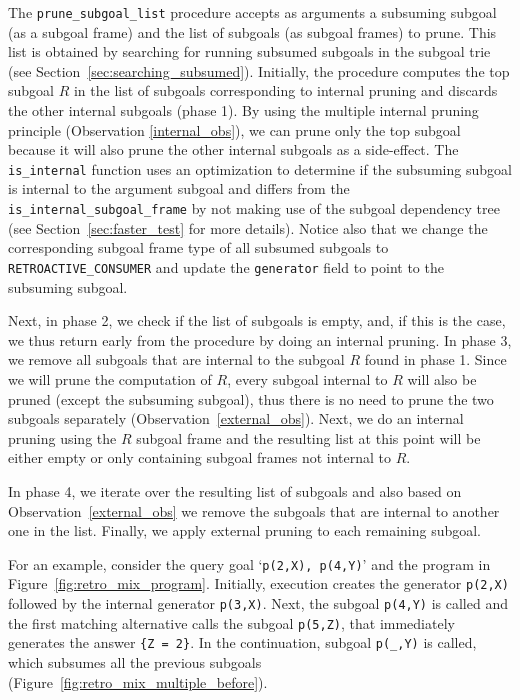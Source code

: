 The \texttt{prune\_subgoal\_list} procedure accepts as arguments a subsuming subgoal (as a subgoal frame) and the list of
subgoals (as subgoal frames) to prune. This list is obtained by searching for running subsumed subgoals in the subgoal trie
(see Section~\ref{sec:searching_subsumed}). Initially, the procedure computes the top subgoal $R$ in the
list of subgoals corresponding to internal pruning and discards the other internal subgoals (phase 1).
By using the multiple internal pruning principle
(Observation \ref{internal_obs}), we can prune only the top subgoal because it
will also prune the other internal subgoals as a side-effect. The \texttt{is\_internal} function uses an optimization
to determine if the subsuming subgoal is internal to the argument subgoal and differs from the
\texttt{is\_internal\_subgoal\_frame} by not making use of the subgoal dependency tree (see Section~\ref{sec:faster_test}
for more details). Notice also that we change the corresponding subgoal frame
type of all subsumed subgoals to \texttt{RETROACTIVE\_CONSUMER} and update the \texttt{generator} field to
point to the subsuming subgoal.

Next, in phase 2, we check if the list of subgoals is empty, and, if this is the case,
we thus return early from the procedure by doing an internal pruning.
In phase 3, we remove all subgoals that are internal to the subgoal $R$ found in phase 1.
Since we will prune the computation of $R$, every subgoal internal to $R$ will also be pruned
(except the subsuming subgoal), thus there is no need to prune the two subgoals separately
(Observation~\ref{external_obs}). Next, we do an internal pruning using the $R$ subgoal frame
and the resulting list at this point will be either empty or only containing subgoal
frames not internal to $R$.

In phase 4, we iterate over the resulting list of subgoals and also based on Observation~\ref{external_obs}
we remove the subgoals that are internal to another one in the list.
Finally, we apply external pruning to each remaining subgoal.

For an example, consider the query goal `\texttt{p(2,X),~p(4,Y)}' and the program in Figure~\ref{fig:retro_mix_program}.
Initially, execution creates the generator \texttt{p(2,X)} followed by the internal
generator \texttt{p(3,X)}. Next, the subgoal \texttt{p(4,Y)} is called and the first matching alternative calls the
subgoal \texttt{p(5,Z)}, that immediately generates the answer \texttt{\{Z~=~2\}}. In the continuation, subgoal
\texttt{p(\_,Y)} is called, which subsumes all the previous subgoals (Figure~\ref{fig:retro_mix_multiple_before}).

